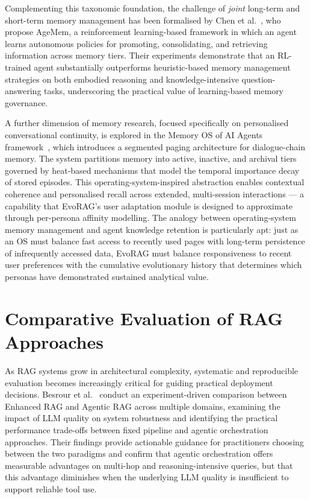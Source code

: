 Complementing this taxonomic foundation, the challenge of \emph{joint} long-term and
short-term memory management has been formalised by
Chen et al.~\cite{chen2026agemem}, who propose AgeMem, a reinforcement learning-based
framework in which an agent learns autonomous policies for promoting, consolidating,
and retrieving information across memory tiers.
Their experiments demonstrate that an RL-trained agent substantially outperforms
heuristic-based memory management strategies on both embodied reasoning and
knowledge-intensive question-answering tasks, underscoring the practical value of
learning-based memory governance.
 
A further dimension of memory research, focused specifically on personalised
conversational continuity, is explored in the Memory OS of AI Agents
framework~\cite{bai2025memos}, which introduces a segmented paging architecture
for dialogue-chain memory.
The system partitions memory into active, inactive, and archival tiers governed by
heat-based mechanisms that model the temporal importance decay of stored episodes.
This operating-system-inspired abstraction enables contextual coherence and
personalised recall across extended, multi-session interactions — a capability that
EvoRAG's user adaptation module is designed to approximate through per-persona
affinity modelling.
The analogy between operating-system memory management and agent knowledge retention
is particularly apt: just as an OS must balance fast access to recently used pages
with long-term persistence of infrequently accessed data, EvoRAG must balance
responsiveness to recent user preferences with the cumulative evolutionary history
that determines which personas have demonstrated sustained analytical value.
 
\section{Comparative Evaluation of RAG Approaches}
 
As RAG systems grow in architectural complexity, systematic and reproducible evaluation
becomes increasingly critical for guiding practical deployment decisions.
Besrour et al.~\cite{besrour2026agenticvsenh} conduct an experiment-driven comparison
between Enhanced RAG and Agentic RAG across multiple domains, examining the impact of
LLM quality on system robustness and identifying the practical performance trade-offs
between fixed pipeline and agentic orchestration approaches.
Their findings provide actionable guidance for practitioners choosing between the two
paradigms and confirm that agentic orchestration offers measurable advantages on
multi-hop and reasoning-intensive queries, but that this advantage diminishes when
the underlying LLM quality is insufficient to support reliable tool use.
 
